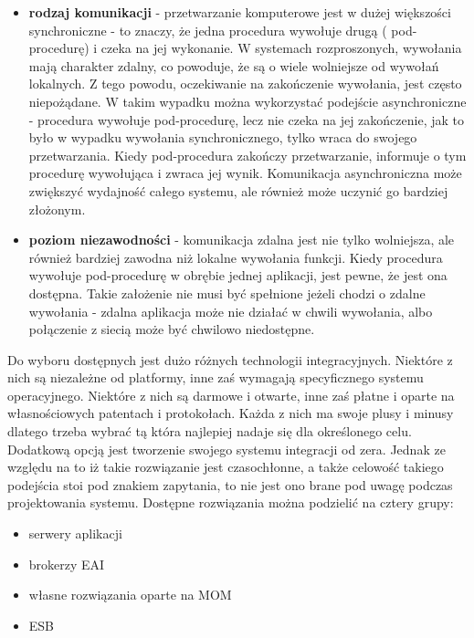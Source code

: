 \begin{itemize}
	\item \textbf{rodzaj komunikacji} - przetwarzanie komputerowe jest w dużej większości synchroniczne - to znaczy, że jedna procedura wywołuje drugą ( pod-procedurę) i czeka na jej wykonanie. W systemach rozproszonych, wywołania mają charakter zdalny, co powoduje, że są o wiele wolniejsze od wywołań lokalnych. Z tego powodu, oczekiwanie na zakończenie wywołania, jest często niepożądane. W takim wypadku można wykorzystać podejście asynchroniczne - procedura wywołuje pod-procedurę, lecz nie czeka na jej zakończenie, jak to było w wypadku wywołania synchronicznego, tylko wraca do swojego przetwarzania. Kiedy pod-procedura zakończy przetwarzanie, informuje o tym procedurę wywołująca i zwraca jej wynik. Komunikacja asynchroniczna może zwiększyć wydajność całego systemu, ale również może uczynić go bardziej złożonym.
	\item \textbf{poziom niezawodności} - komunikacja zdalna jest nie tylko wolniejsza, ale również bardziej zawodna niż lokalne wywołania funkcji. Kiedy procedura wywołuje pod-procedurę w obrębie jednej aplikacji, jest pewne, że jest ona dostępna. Takie założenie nie musi być spełnione jeżeli chodzi o zdalne wywołania - zdalna aplikacja może nie działać w chwili wywołania, albo połączenie z siecią może być chwilowo niedostępne.
\end{itemize}

Do wyboru dostępnych jest dużo różnych technologii integracyjnych. Niektóre z nich są niezależne od platformy, inne zaś wymagają specyficznego systemu operacyjnego. Niektóre z nich są darmowe i otwarte, inne zaś płatne i oparte na własnościowych patentach i protokołach. Każda z nich ma swoje plusy i minusy dlatego trzeba wybrać tą która najlepiej nadaje się dla określonego celu. Dodatkową opcją jest tworzenie swojego systemu integracji od zera. Jednak ze względu na to iż takie rozwiązanie jest czasochłonne, a także celowość takiego podejścia stoi pod znakiem zapytania, to nie jest ono brane pod uwagę podczas projektowania systemu. 
Dostępne rozwiązania można podzielić na cztery grupy: \cite{chappell2004}

\begin{itemize}
	\item serwery aplikacji
	\item brokerzy EAI
	\item własne rozwiązania oparte na  MOM
	\item ESB
\end{itemize}

